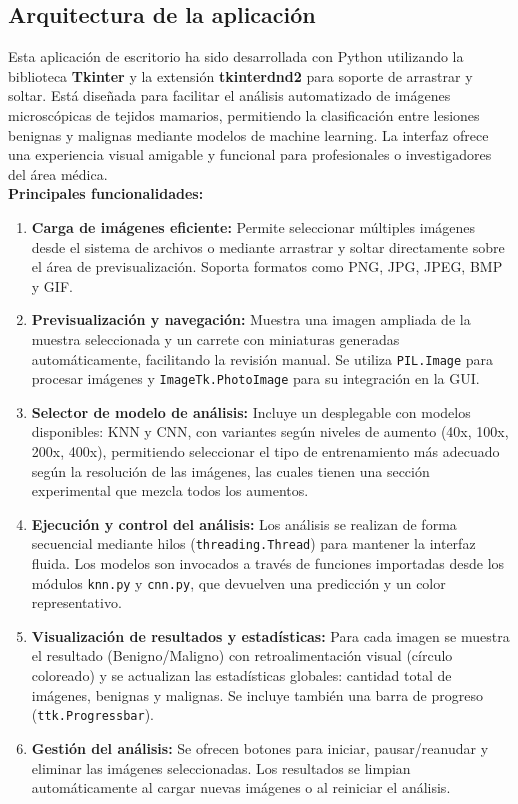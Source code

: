 \documentclass[12pt]{article} %
\begin{document}
\subsection{Arquitectura de la aplicación}
Esta aplicación de escritorio ha sido desarrollada con Python utilizando la biblioteca \textbf{Tkinter} y la extensión \textbf{tkinterdnd2} para soporte de arrastrar y soltar. Está diseñada para facilitar el análisis automatizado de imágenes microscópicas de tejidos mamarios, permitiendo la clasificación entre lesiones benignas y malignas mediante modelos de machine learning. La interfaz ofrece una experiencia visual amigable y funcional para profesionales o investigadores del área médica.\\

\textbf{Principales funcionalidades:} 

\begin{enumerate}
    \item \textbf{Carga de imágenes eficiente:}  Permite seleccionar múltiples imágenes desde el sistema de archivos o mediante arrastrar y soltar directamente sobre el área de previsualización. Soporta formatos como PNG, JPG, JPEG, BMP y GIF.

    \item \textbf{Previsualización y navegación:} Muestra una imagen ampliada de la muestra seleccionada y un carrete con miniaturas generadas automáticamente, facilitando la revisión manual. Se utiliza \textcolor[HTML]{006400}{\texttt{PIL.Image}} para procesar imágenes y \textcolor[HTML]{006400}{\texttt{ImageTk.PhotoImage}} para su integración en la GUI.
    \item \textbf{Selector de modelo de análisis:} Incluye un desplegable con modelos disponibles: KNN y CNN, con variantes según niveles de aumento (40x, 100x, 200x, 400x), permitiendo seleccionar el tipo de entrenamiento más adecuado según la resolución de las imágenes, las cuales tienen una sección experimental que mezcla todos los aumentos.
    \item \textbf{Ejecución y control del análisis:} 
    Los análisis se realizan de forma secuencial mediante hilos (\textcolor[HTML]{006400}{\texttt{threading.Thread}}) para mantener la interfaz fluida. Los modelos son invocados a través de funciones importadas desde los módulos \textcolor[HTML]{006400}{\texttt{knn.py}} y \textcolor[HTML]{006400}{\texttt{cnn.py}}, que devuelven una predicción y un color representativo.
    \item \textbf{Visualización de resultados y estadísticas:}
    Para cada imagen se muestra el resultado (Benigno/Maligno) con retroalimentación visual (círculo coloreado) y se actualizan las estadísticas globales: cantidad total de imágenes, benignas y malignas. Se incluye también una barra de progreso (\textcolor[HTML]{006400}{\texttt{ttk.Progressbar}}).
    \item \textbf{Gestión del análisis:} 
    Se ofrecen botones para iniciar, pausar/reanudar y eliminar las imágenes seleccionadas. Los resultados se limpian automáticamente al cargar nuevas imágenes o al reiniciar el análisis.
\end{enumerate}
\end{document}

